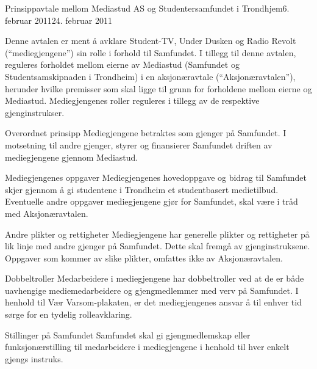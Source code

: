 \begin{instruks}{Prinsippavtale mellom Mediastud AS og Studentersamfundet i Trondhjem}{6. februar 2011}{24. februar 2011}


    Denne avtalen er ment å avklare Student-TV, Under Dusken og Radio Revolt
    (``mediegjengene'') sin rolle i forhold til Samfundet. I tillegg til denne avtalen, reguleres forholdet mellom
    eierne av Mediastud (Samfundet og Studentsamskipnaden i Trondheim) i en aksjonæravtale
    (``Aksjonæravtalen''), herunder hvilke premisser som skal ligge til grunn for forholdene mellom
    eierne og Mediastud. Mediegjengenes roller reguleres i tillegg av de respektive gjenginstrukser.


    \begin{instruksledd}{Overordnet prinsipp}
        Mediegjengene betraktes som gjenger på Samfundet. I motsetning til andre gjenger,
        styrer og finansierer Samfundet driften av mediegjengene gjennom Mediastud.  
    \end{instruksledd}

    \begin{instruksledd}{Mediegjengenes oppgaver}
        Mediegjengenes hovedoppgave og bidrag til Samfundet skjer gjennom å gi studentene i
        Trondheim et studentbasert medietilbud. Eventuelle andre oppgaver mediegjengene gjør for
        Samfundet, skal være i tråd med Aksjonæravtalen.  
    \end{instruksledd}        

    \begin{instruksledd}{Andre plikter og rettigheter}
        Mediegjengene har generelle plikter og rettigheter på lik linje med andre gjenger på
        Samfundet.  Dette skal fremgå av gjenginstruksene. Oppgaver som kommer av slike plikter, omfattes ikke
        av Aksjonæravtalen.  
    \end{instruksledd}

    \begin{instruksledd}{Dobbeltroller}
        Medarbeidere i mediegjengene har dobbeltroller ved at de er både uavhengige
        mediemedarbeidere
        og gjengmedlemmer med verv på Samfundet. I henhold til Vær Varsom-plakaten, er det
        mediegjengenes ansvar å til enhver tid sørge for en tydelig rolleavklaring.
    \end{instruksledd}


    \begin{instruksledd}{Stillinger på Samfundet}
        Samfundet skal gi gjengmedlemskap eller funksjonærstilling til medarbeidere i
        mediegjengene i henhold til hver enkelt gjengs instruks.
    \end{instruksledd}



\end{instruks}

